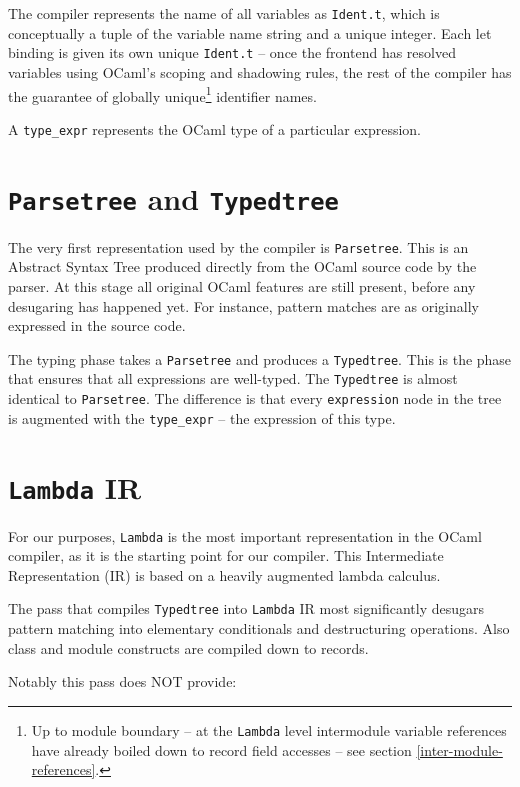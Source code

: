 \documentclass[12pt,a4paper,twoside,openright]{report}
\begin{document}
The compiler represents the name of all variables as \lstinline!Ident.t!, which
is conceptually a tuple of the variable name string and a unique integer. Each
let binding is given its own unique \lstinline!Ident.t! -- once the frontend
has resolved variables using OCaml's scoping and shadowing rules, the rest of
the compiler has the guarantee of globally unique\footnote{Up to module
boundary -- at the \lstinline!Lambda! level intermodule variable references
have already boiled down to record field accesses -- see section
\ref{inter-module-references}.} identifier names.

A \lstinline!type_expr! represents the OCaml type of a particular expression.

\section{\texttt{Parsetree} and \texttt{Typedtree}}

The very first representation used by the compiler is \lstinline!Parsetree!.
This is an Abstract Syntax Tree produced directly from the OCaml source code by
the parser. At this stage all original OCaml features are still present, before
any desugaring has happened yet. For instance, pattern matches are as
originally expressed in the source code.

The typing phase takes a \lstinline!Parsetree! and produces a
\lstinline!Typedtree!. This is the phase that ensures that all expressions are
well-typed. The \lstinline!Typedtree! is almost identical to
\lstinline!Parsetree!. The difference is that every \lstinline!expression! node
in the tree is augmented with the \lstinline!type_expr! -- the expression of
this type.

\section{\texttt{Lambda} IR}

For our purposes, \lstinline!Lambda! is the most important representation in
the OCaml compiler, as it is the starting point for our compiler. This
Intermediate Representation (IR) is based on a heavily augmented lambda calculus.

The pass that compiles \lstinline!Typedtree! into \lstinline!Lambda! IR most
significantly desugars pattern matching into elementary conditionals and
destructuring operations. Also class and module constructs are compiled down to
records.

Notably this pass does NOT provide:
\end{document}
